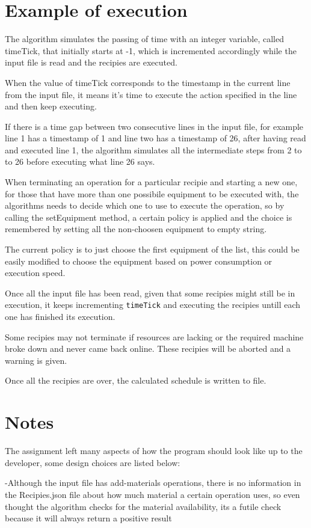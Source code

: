 \documentclass[12pt]{article}
\newcommand{\code}[1]{\colorbox{light-gray}{\texttt{#1}}}
\begin{document}
\section{Example of execution}
The algorithm simulates the passing of time with an integer variable, called timeTick, that initially starts at -1, which is incremented accordingly while the input file is read and the recipies are executed.

When the value of timeTick corresponds to the timestamp in the current line from the input file, it means it's time to execute the action specified in the line and then keep executing.

If there is a time gap between two consecutive lines in the input file, for example line 1 has a timestamp of 1 and line two has a timestamp of 26, after having read and executed line 1, the algorithm simulates all the intermediate steps from 2 to to 26 before executing what line 26 says.

When terminating an operation for a particular recipie and starting a new one, for those that have more than one possibile equipment to be executed with, the algorithms needs to decide which one to use to execute the operation, so by calling the setEquipment method, a certain policy is applied and the choice is remembered by setting all the non-choosen equipment to empty string.

The current policy is to just choose the first equipment of the list, this could be easily modified to choose the equipment based on power consumption or execution speed.

Once all the input file has been read, given that some recipies might still be in execution, it keeps incrementing \code{timeTick} and executing the recipies untill each one has finished its execution.

Some recipies may not terminate if resources are lacking or the required machine broke down and never came back online. These recipies will be aborted and a warning is given.

Once all the recipies are over, the calculated schedule is written to file.

\section{Notes}
The assignment left many aspects of how the program should look like up to the developer, some design choices are listed below:

-Although the input file has add-materials operations, there is no information in the Recipies.json file about how much material a certain operation uses, so even thought the algorithm checks for the material availability, its a futile check because it will always return a positive result
\end{document}
